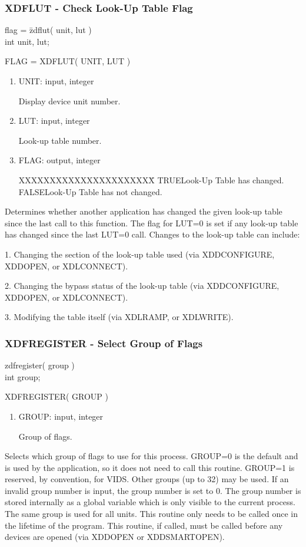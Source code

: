 \subsubsection{XDFLUT - Check Look-Up Table Flag}
\begin{tabbing}
flag = \=zdflut( unit, lut )\\
\>int  unit, lut;\\
\end{tabbing}
FLAG = XDFLUT( UNIT, LUT )
\begin{enumerate}
\item UNIT:  input, integer

Display device unit number.
\item LUT:  input, integer

Look-up table number.
\item FLAG:  output, integer
\begin{tabbing}
XXXXXXXXXXXXXXXXXXXXXX\=\kill
TRUE\>Look-Up Table has changed.\\
FALSE\>Look-Up Table has not changed.\\
\end{tabbing}
\end{enumerate}
Determines whether another application has changed the given look-up
table since the last call to this function.  The flag for LUT=0
is set if any look-up table has changed since the last LUT=0 call.
Changes to the look-up table can include:

1.  Changing the section of the look-up table used (via XDDCONFIGURE, XDDOPEN,
or XDLCONNECT).

2.  Changing the bypass status of the look-up table (via XDDCONFIGURE, XDDOPEN,
or XDLCONNECT).

3.  Modifying the table itself (via XDLRAMP, or XDLWRITE).
\newpage
\subsubsection{XDFREGISTER - Select Group of Flags}
\begin{tabbing}
zdfregister( group )\\
int  group;\\
\end{tabbing}
XDFREGISTER( GROUP )
\begin{enumerate}
\item GROUP:  input, integer

Group of flags.
\end{enumerate}
Selects which group of flags to use for this process.  GROUP=0 is the
default and is used by the application, so it does not need to call
this routine.  GROUP=1 is reserved, by convention, for VIDS.  Other groups
(up to 32) may be used.  If an invalid group number is input, the group
number is set to 0.  The group number is stored internally as a global
variable which is only visible to the current process.  The same group
is used for all units.  This routine only needs to be called once in the
lifetime of the program.  This routine, if called, must be called before
any devices are opened (via XDDOPEN or XDDSMARTOPEN).
\newpage
